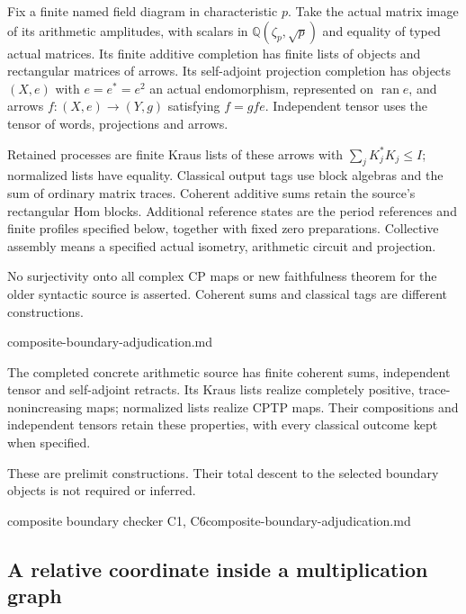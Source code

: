 \begin{definition}
Fix a finite named field diagram in characteristic $p$. Take the actual
matrix image of its arithmetic amplitudes, with scalars in
$\mathbb Q(\zeta_p,\sqrt p)$ and equality of typed actual matrices.
Its finite additive completion has finite lists of objects and rectangular
matrices of arrows. Its self-adjoint projection completion has objects
$(X,e)$ with $e=e^*=e^2$ an actual endomorphism, represented on
$\operatorname{ran}e$, and arrows $f:(X,e)\to(Y,g)$ satisfying $f=gfe$.
Independent tensor uses the tensor of words, projections and arrows.

Retained processes are finite Kraus lists of these arrows with
$\sum_jK_j^*K_j\leq I$; normalized lists have equality. Classical output
tags use block algebras and the sum of ordinary matrix traces. Coherent
additive sums retain the source's rectangular Hom blocks. Additional
reference states are the period references and finite profiles specified
below, together with fixed zero preparations. Collective assembly means
a specified actual isometry, arithmetic circuit and projection.
\end{definition}
\begin{scope}
No surjectivity onto all complex CP maps or new faithfulness theorem for
the older syntactic source is asserted. Coherent sums and classical tags
are different constructions.
\end{scope}
{composite-boundary-adjudication.md}

\begin{proposition}
\statusSketch\quad
The completed concrete arithmetic source has finite coherent sums,
independent tensor and self-adjoint retracts. Its Kraus lists realize
completely positive, trace-nonincreasing maps; normalized lists realize
CPTP maps. Their compositions and independent tensors retain these
properties, with every classical outcome kept when specified.
\end{proposition}
\begin{scope}
These are prelimit constructions. Their total descent to the selected
boundary objects is not required or inferred.
\end{scope}
{composite boundary checker C1, C6}{composite-boundary-adjudication.md}

\subsection{A relative coordinate inside a multiplication graph}

